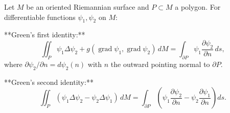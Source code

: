 Let $M$ be an oriented Riemannian surface and $P \subset M$ a polygon. For differentiable functions $\psi_1, \psi_2$ on $M$:

**Green's first identity:**
$$\iint_P \psi_1 \Delta\psi_2 + g(\operatorname{grad} \psi_1, \operatorname{grad} \psi_2) \, dM = \int_{\partial P} \psi_1 \frac{\partial\psi_2}{\partial n} \, ds,$$
where $\partial\psi_2/\partial n = d\psi_2(n)$ with $n$ the outward pointing normal to $\partial P$.

**Green's second identity:**
$$\iint_P (\psi_1 \Delta\psi_2 - \psi_2 \Delta\psi_1) \, dM = \int_{\partial P} \left(\psi_1 \frac{\partial\psi_2}{\partial n} - \psi_2 \frac{\partial\psi_1}{\partial n}\right) ds.$$